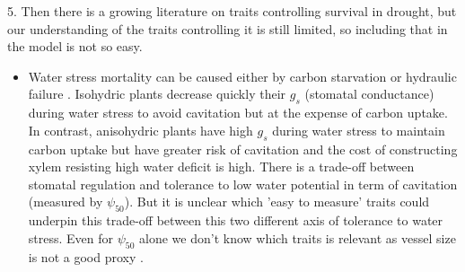 \documentclass[a4paper,11pt]{article}
\begin{document}
5. Then there is a growing literature on traits controlling survival in drought, but our understanding of the traits controlling it is still limited, so including that in the model is not so easy.

\begin{itemize}
\item Water stress mortality can be caused either by carbon starvation or hydraulic failure \citep{McDowell-2008,McDowell-2011,Skelton-2015}. Isohydric plants decrease quickly their $g_s$ (stomatal conductance) during water stress to avoid cavitation but at the expense of carbon uptake. In contrast, anisohydric plants have high $g_s$ during water stress to maintain carbon uptake but have greater risk of cavitation and the cost of constructing xylem resisting high water deficit is high. There is a trade-off between stomatal regulation and tolerance to low water potential in term of cavitation (measured by $\psi_{50}$). But it is unclear which 'easy to measure' traits could underpin this trade-off between this two different axis of tolerance to water stress. Even for $\psi_{50}$ alone we don't know which traits is relevant as vessel size is not a good proxy \citep{Maherali-2004}.
\end{itemize}





\clearpage



\end{document}
